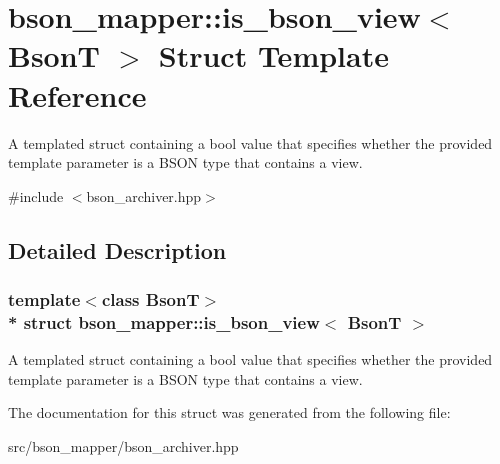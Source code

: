 \hypertarget{structbson__mapper_1_1is__bson__view}{}\section{bson\+\_\+mapper\+:\+:is\+\_\+bson\+\_\+view$<$ BsonT $>$ Struct Template Reference}
\label{structbson__mapper_1_1is__bson__view}


A templated struct containing a bool value that specifies whether the provided template parameter is a B\+S\+ON type that contains a view.  




{\ttfamily \#include $<$bson\+\_\+archiver.\+hpp$>$}



\subsection{Detailed Description}
\subsubsection*{template$<$class BsonT$>$\\*
struct bson\+\_\+mapper\+::is\+\_\+bson\+\_\+view$<$ Bson\+T $>$}

A templated struct containing a bool value that specifies whether the provided template parameter is a B\+S\+ON type that contains a view. 

The documentation for this struct was generated from the following file\+:\begin{DoxyCompactItemize}
\item 
src/bson\+\_\+mapper/bson\+\_\+archiver.\+hpp\end{DoxyCompactItemize}
